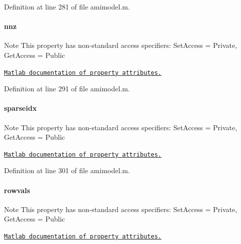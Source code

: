 Definition at line 281 of file amimodel.\+m.

\hypertarget{classamimodel_a825ec588729c090ff51ea3473dcbc6b9}{}
\paragraph[{nnz}]{\setlength{\rightskip}{0pt plus 5cm}nnz}\label{classamimodel_a825ec588729c090ff51ea3473dcbc6b9}
\begin{DoxyNote}{Note}
This property has non-\/standard access specifiers\+: {\ttfamily Set\+Access = Private, Get\+Access = Public} 

\href{http://www.mathworks.com/help/matlab/matlab_oop/property-attributes.html}{\tt Matlab documentation of property attributes.} 
\end{DoxyNote}


Definition at line 291 of file amimodel.\+m.

\hypertarget{classamimodel_a6ffb112eda9ff756e17104210981b30b}{}
\paragraph[{sparseidx}]{\setlength{\rightskip}{0pt plus 5cm}sparseidx}\label{classamimodel_a6ffb112eda9ff756e17104210981b30b}
\begin{DoxyNote}{Note}
This property has non-\/standard access specifiers\+: {\ttfamily Set\+Access = Private, Get\+Access = Public} 

\href{http://www.mathworks.com/help/matlab/matlab_oop/property-attributes.html}{\tt Matlab documentation of property attributes.} 
\end{DoxyNote}


Definition at line 301 of file amimodel.\+m.

\hypertarget{classamimodel_aa0abea3560da3f409a28567f42d52872}{}
\paragraph[{rowvals}]{\setlength{\rightskip}{0pt plus 5cm}rowvals}\label{classamimodel_aa0abea3560da3f409a28567f42d52872}
\begin{DoxyNote}{Note}
This property has non-\/standard access specifiers\+: {\ttfamily Set\+Access = Private, Get\+Access = Public} 

\href{http://www.mathworks.com/help/matlab/matlab_oop/property-attributes.html}{\tt Matlab documentation of property attributes.} 
\end{DoxyNote}


